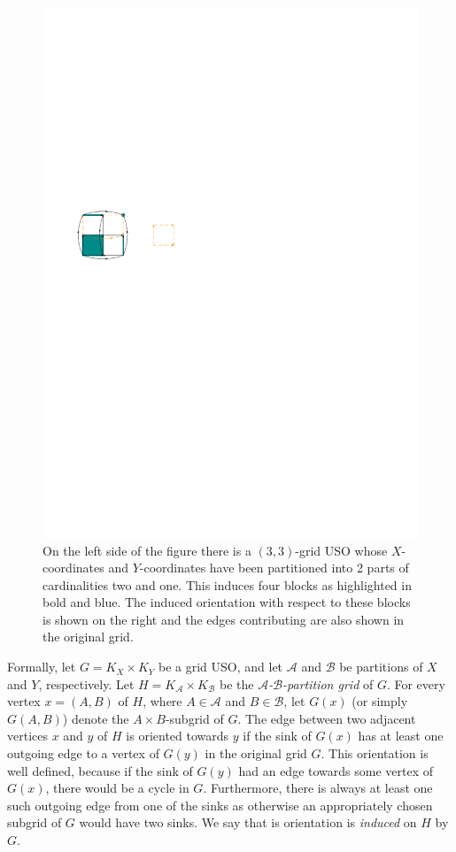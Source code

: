 \documentclass[a4paper,10pt]{article}
\newcommand{\A}{\ensuremath{\mathcal A}}
\newcommand{\B}{\ensuremath{\mathcal B}}
\begin{document}
  \begin{figure}[htbp] 
  	\centering
  	\includegraphics[scale=1.5]{induced_orientation_ex.pdf}
  	\caption{\small On the left side of the figure there is a $(3,3)$-grid USO whose $X$-coordinates and $Y$-coordinates have been partitioned into 2 parts of cardinalities two and one. This induces four blocks as highlighted in bold and blue. The induced orientation with respect to these blocks is shown on the right and the edges contributing are also shown in the original grid.} 
  	\label{fig:example_induced_orientation}
  \end{figure}

Formally, let $G = K_X \times K_Y$ be a grid USO,
and let $\A$ and $\B$ be partitions of $X$ and $Y$, respectively.
Let $H = K_\A \times K_\B$ be the \emph{$\A$-$\B$-partition grid} of $G$.
For every vertex $x = (A,B)$ of $H$, where $A\in \A$ and $B \in \B$, let $G(x)$ (or simply $G(A,B)$)
denote the $A \times B$-subgrid of $G$. 
The edge between two adjacent vertices $x$ and $y$ of $H$ is oriented towards $y$ if the sink of $G(x)$ has at least one outgoing edge to a vertex of $G(y)$ in the original grid $G$. 
This orientation is well defined, because if the sink of $G(y)$ had an edge towards some vertex of $G(x)$, there would be a cycle in $G$. 
Furthermore, there is always at least one such outgoing edge from one of the sinks as otherwise an appropriately chosen subgrid of $G$ would have two sinks. 
We say that is orientation is \emph{induced} on $H$ by $G$.
\end{document}
